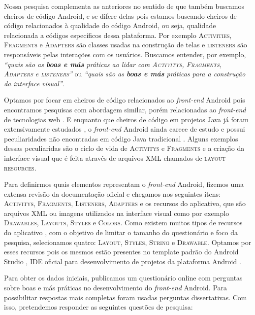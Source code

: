 Nossa pesquisa complementa as anteriores no sentido de que também buscamos cheiros de código Android, e se difere delas pois estamos buscando cheiros de código relacionados à qualidade do código Android, ou seja, qualidade relacionada a códigos específicos dessa plataforma. Por exemplo \textsc{Activities}, \textsc{Fragments} e \textsc{Adapters} são classes usadas na construção de telas e \textsc{listeners} são responsáveis pelas interações com os usuários. Buscamos entender, por exemplo, \textit{``quais são as \textbf{boas e más} práticas ao lidar com \textsc{Activitys}, \textsc{Fragments}, \textsc{Adapters} e \textsc{listeners}''} ou \textit{``quais são as \textbf{boas e más} práticas para a construção da interface visual''}. 

Optamos por focar em cheiros de código relacionados ao \textit{front-end} Android pois encontramos pesquisas com abordagem similar, porém relacionadas ao \textit{front-end} de tecnologias web \cite{CSSCodeSmell, BB, FinavaroAniche2016}. E enquanto que cheiros de código em projetos Java já foram extensivamente estudados \cite{Riel, Refactoring:99, Martin:2008:CCH:1388398}, o \textit{front-end} Android ainda carece de estudo e possui peculiaridades não encontradas em código Java tradicional \cite{Mannan_Dig_Ahmed_Jensen_Abdullah_Almurshed}. Alguns exemplos dessas peculiaridas são o ciclo de vida de \textsc{Activitys} e \textsc{Fragments} e a criação da interface visual que é feita através de arquivos XML chamados de \textsc{layout resources}.

Para definirmos quais elementos representam o \textit{front-end} Android, fizemos uma extensa revisão da documentação oficial \cite{AndroidDeveloperSite2016} e chegamos nos seguintes itens: \textsc{Activitys}, \textsc{Fragments}, \textsc{Listeners}, \textsc{Adapters} e os recursos do aplicativo, que são arquivos XML ou imagens utilizados na interface visual como por exemplo \textsc{Drawables}, \textsc{Layouts}, \textsc{Styles} e \textsc{Colors}. Como existem muitos tipos de recursos do aplicativo \cite{AndroidResourcesOverview}, com o objetivo de limitar o tamanho do questionário e foco da pesquisa, selecionamos quatro: \textsc{Layout}, \textsc{Styles}, \textsc{String} e \textsc{Drawable}. Optamos por esses recursos pois os mesmos estão presentes no template padrão do Android Studio \cite{FirstApp2017}, IDE oficial para desenvolvimento de projetos da plataforma Android \cite{AndroidStudio}. 

Para obter os dados iniciais, publicamos um questionário online com perguntas sobre boas e más práticas no desenvolvimento do \textit{front-end} Android. Para possibilitar respostas mais completas foram usadas perguntas dissertativas. Com isso, pretendemos responder as seguintes questões de pesquisa: \\

